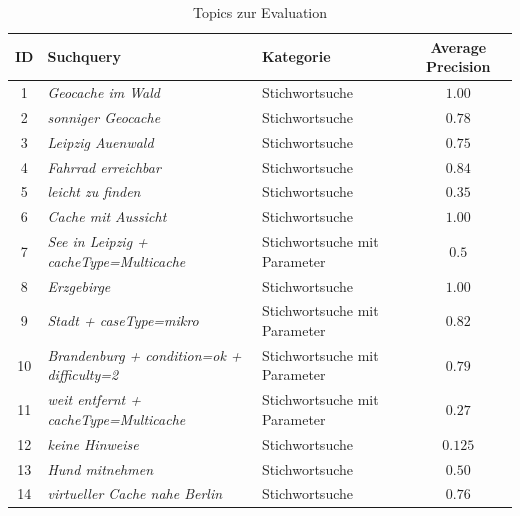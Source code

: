 \documentclass[11pt,a4paper]{scrreprt}
\begin{document}
\begin{table}
\caption{Topics zur Evaluation}
\label{table:eval}
\renewcommand{\arraystretch}{1.5}
\begin{tabular}{cllc}
\toprule
ID 	&	Suchquery							&	Kategorie 				&	Average Precision\\
\midrule
1	&	\textit{Geocache im Wald}					&	Stichwortsuche			&	$1.00$\\
2	&	\textit{sonniger Geocache}				&	Stichwortsuche			&	$0.78$\\
3	&	\textit{Leipzig Auenwald}					&	Stichwortsuche			&	$0.75$\\
4	&	\textit{Fahrrad erreichbar}				&	Stichwortsuche			&	$0.84$\\
5	&	\textit{leicht zu finden}					&	Stichwortsuche			&	$0.35$\\
6	&	\textit{Cache mit Aussicht}				&	Stichwortsuche			&	$1.00$\\
7	&	\textit{See in Leipzig + cacheType=Multicache}	&	Stichwortsuche mit Parameter	& 	$0.5$\\
8	&	\textit{Erzgebirge}						&	Stichwortsuche			&	$1.00$\\
9	&	\textit{Stadt + caseType=mikro}				&	Stichwortsuche mit Parameter	&	$0.82$\\
10	&	\textit{Brandenburg + condition=ok + difficulty=2} 	&	Stichwortsuche mit Parameter	&	$0.79$\\
11	&	\textit{weit entfernt + cacheType=Multicache}	&	Stichwortsuche mit Parameter	&	$0.27$\\
12	&	\textit{keine Hinweise}					&	Stichwortsuche			&	$0.125$\\
13	&	\textit{Hund mitnehmen}					&	Stichwortsuche			&	$0.50$\\
14	&	\textit{virtueller Cache nahe Berlin}			&	Stichwortsuche			&	$0.76$\\
\bottomrule
\end{tabular}
\end{table}
\end{document}
